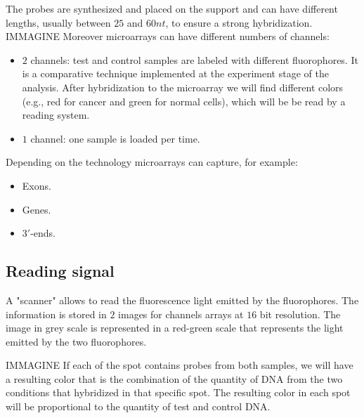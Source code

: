	The probes are synthesized and placed on the support and can have different lengths, usually between $25$ and $60nt$, to ensure a strong hybridization. 
	IMMAGINE
	Moreover microarrays can have different numbers of channels:

	\begin{multicols}{2}
		\begin{itemize}
			\item $2$ channels: test and control samples are labeled with different fluorophores. It is a comparative technique implemented at the experiment stage of the analysis. After hybridization to the microarray we will find different colors (e.g., red for cancer and green for normal cells), which will be be read by a reading system.
			\item $1$ channel: one sample is loaded per time.
		\end{itemize}
	\end{multicols}

	Depending on the technology microarrays can capture, for example:

	\begin{multicols}{3}
		\begin{itemize}
			\item Exons.
			\item Genes.
			\item $3'$-ends.
		\end{itemize}
	\end{multicols}

	\subsection{Reading signal}
	A "scanner" allows to read the fluorescence light emitted by the fluorophores.
	The information is stored in $2$ images for channels arrays at $16$ bit resolution.
	The image in grey scale is represented in a red-green scale that represents the light emitted by the two fluorophores.
	
	IMMAGINE
	If each of the spot contains probes from both samples, we will have a resulting color that is the combination of the quantity of DNA from the two conditions that hybridized in that specific spot. 
	The resulting color in each spot will be proportional to the quantity of test and control DNA.
	 
